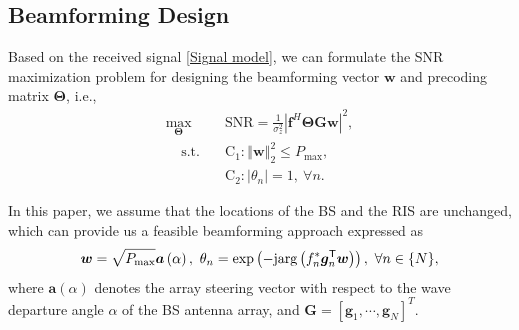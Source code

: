\documentclass[journal,twocolumn]{IEEEtran}
\theoremstyle{nonumberplain}
\def \T {\bm \Theta}
\def \exp {\text{exp}}
\def \arg {\text{arg}}
\def \T {^{\mathsf{T}}}
\begin{document}
        \subsection{Beamforming Design}
        \label{Beamforming design}
        Based on the received signal \eqref{Signal model}, we can formulate the \ac{SNR} maximization problem for designing the beamforming vector $\bm w$ and precoding matrix $\bm \Theta$, i.e.,
        \begin{subequations}
            \label{optimization}
            \begin{align}
            \label{objective}
                \max_{\bm \Theta}~~&\text{SNR}=\frac{1}{\sigma_{z}^{2}}
                \left\vert
                \bm f^{H}\bm \Theta\bm G\bm w \right\vert^{2},\\
            \label{constraint}
                ~~~~~\text{s.t.~~~}&\text{C}_{1}: \left\Vert \bm w\right \Vert_{2}^{2}\leq P_{\text{max}},\\
                &\text{C}_{2}: \left\vert\theta_{n}\right\vert=1,~\forall n.
            \end{align}
        \end{subequations}
        
    In this paper, we assume that the locations of the \ac{BS} and the RIS are unchanged, which can provide us a feasible beamforming approach expressed as
    \begin{equation}
        \label{traditional beamforming}
        \bm w=\sqrt{P_{\rm max}}\bm a\left(\alpha\right),~ \theta_{n} = \exp\left(-{\rm j} \arg\left(f_{n}^{*}\bm g_{n}\T \bm w\right)\right),~\forall n\in \{N\},
    \end{equation}
    where $\bm a(\alpha)$ denotes the array steering vector with respect to the wave departure angle $\alpha$ of the BS antenna array, and $\bm G = \left[\bm g_{1}, \cdots, \bm g_{N}\right]^{T}$.
\end{document}
